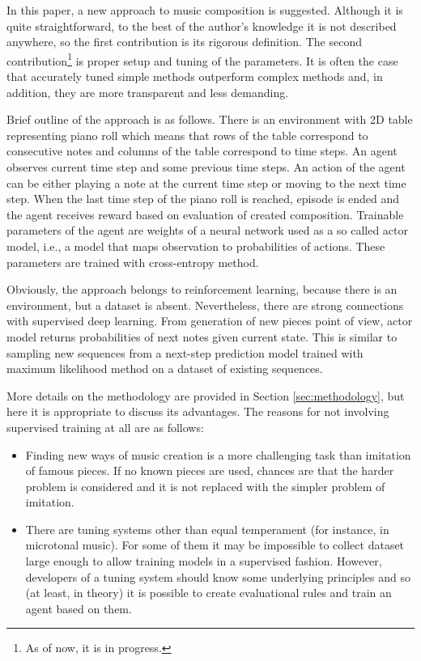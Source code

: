 \documentclass{article}
\begin{document}
In this paper, a new approach to music composition is suggested. Although it is quite straightforward, to the best of the author's knowledge it is not described anywhere, so the first contribution is its rigorous definition. The second contribution\footnote{As of now, it is in progress.} is proper setup and tuning of the parameters. It is often the case that accurately tuned simple methods outperform complex methods \cite{dacrema2019are} and, in addition, they are more transparent and less demanding.

Brief outline of the approach is as follows. There is an environment with 2D table representing piano roll which means that rows of the table correspond to consecutive notes and columns of the table correspond to time steps. An agent observes current time step and some previous time steps. An action of the agent can be either playing a note at the current time step or moving to the next time step. When the last time step of the piano roll is reached, episode is ended and the agent receives reward based on evaluation of created composition. Trainable parameters of the agent are weights of a neural network used as a so called actor model, i.e., a model that maps observation to probabilities of actions. These parameters are trained with cross-entropy method.

Obviously, the approach belongs to reinforcement learning, because there is an environment, but a dataset is absent. Nevertheless, there are strong connections with supervised deep learning. From generation of new pieces point of view, actor model returns probabilities of next notes given current state. This is similar to sampling new sequences from a next-step prediction model trained with maximum likelihood method on a dataset of existing sequences.

More details on the methodology are provided in Section \ref{sec:methodology}, but here it is appropriate to discuss its advantages. The reasons for not involving supervised training at all are as follows:
\begin{itemize}
	\item Finding new ways of music creation is a more challenging task than imitation of famous pieces. If no known pieces are used, chances are that the harder problem is considered and it is not replaced with the simpler problem of imitation.
	\item There are tuning systems other than equal temperament (for instance, in microtonal music). For some of them it may be impossible to collect dataset large enough to allow training models in a supervised fashion. However, developers of a tuning system should know some underlying principles and so (at least, in theory) it is possible to create evaluational rules and train an agent based on them.
\end{itemize}
\end{document}
